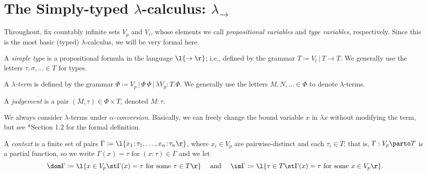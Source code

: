 \documentclass[reqno]{amsart}
\begin{document}
    \section{The Simply-typed $\lambda$-calculus: $\lambda_\rightarrow$}

    Throughout, fix countably infinite sets $V_p$ and $V_t$, whose elements we call \textit{propositional variables} and \textit{type variables}, respectively. Since this is the most basic (typed) $\lambda$-calculus, we will be very formal here.

    \begin{definition}
        A \textit{simple type} is a propositional formula in the language $\l\{\rightarrow\r\}$; i.e., defined by the grammar $T\coloneqq V_t\,|\,T\rightarrow T$. We generally use the letters $\tau,\sigma,\ldots\in T$ for types.
    \end{definition}

    \begin{definition}
        A \textit{$\lambda$-term} is defined by the grammar $\Phi\coloneqq V_p\,|\,\Phi\,\Phi\,|\,\lambda V_p\!:\!T.\Phi$. We generally use the letters $M,N,\ldots\in\Phi$ to denote $\lambda$-terms.
    \end{definition}

    \begin{definition}
        A \textit{judgement} is a pair $(M,\tau)\in\Phi\times T$, denoted $M\!:\!\tau$.
    \end{definition}

    \begin{remark}
        We always consider $\lambda$-terms under \textit{$\alpha$-conversion}. Basically, we can freely change the bound variable $x$ in $\lambda x$ without modifying the term, but see \cite{SU06}*{Section 1.2} for the formal definition.
    \end{remark}

    \begin{definition}
        A \textit{context} is a finite set of pairs $\Gamma\coloneqq\l\{x_1\!:\!\tau_1,\dots,x_n\!:\!\tau_n\r\}$, where $x_i\in V_p$ are pairwise-distinct and each $\tau_i\in T$; that is, $\Gamma:V_p\parto T$ is a partial function, so we write $\Gamma(x)=\tau$ for $(x\!:\!\tau)\in\Gamma$ and we let
        \begin{equation*}
            \dom\Gamma\coloneqq\l\{x\in V_p\st\Gamma(x)=\tau\textrm{ for some }\tau\in T\r\}\ \ \ \ \textrm{and}\ \ \ \ \im\Gamma\coloneqq\l\{\tau\in T\st\Gamma(x)=\tau\textrm{ for some }x\in V_p\r\}.
        \end{equation*}
    \end{definition}
\end{document}
